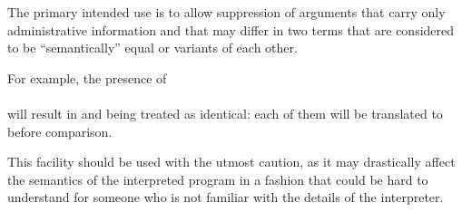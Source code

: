 The primary intended use is to allow suppression of arguments that carry only
administrative information and that may differ in two terms that are
considered to be ``semantically'' equal or variants of each other.

For example, the presence of\\
\ind{}\\
will result in  and  being treated as
identical: each of them will be translated to  before
comparison.

\begin{Warning}
This facility should be used with the utmost caution, as it may drastically
affect the semantics of the interpreted program in a fashion that could be
hard to understand for someone who is not familiar with the details of the
interpreter.
\end{Warning}
